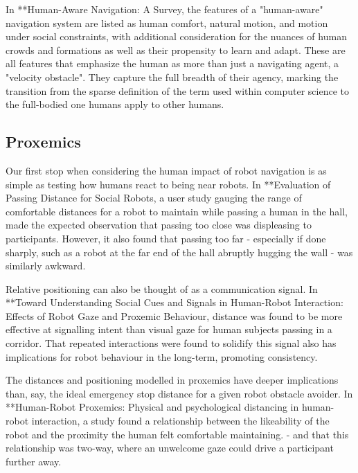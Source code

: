 \documentclass{sfuthesis}
\begin{document}
In **Human-Aware Navigation: A Survey, the features of a "human-aware" navigation system are listed as human comfort, natural motion, and motion under social constraints, with additional consideration for the nuances of human crowds and formations as well as their propensity to learn and adapt. These are all features that emphasize the human as more than just a navigating agent, a "velocity obstacle". They capture the full breadth of their agency, marking the transition from the sparse definition of the term used within computer science to the full-bodied one humans apply to other humans.





\subsection{Proxemics}

Our first stop when considering the human impact of robot navigation is as simple as testing how humans react to being near robots. In **Evaluation of Passing Distance for Social Robots, a user study gauging the range of comfortable distances for a robot to maintain while passing a human in the hall, made the expected observation that passing too close was displeasing to participants. However, it also found that passing too far - especially if done sharply, such as a robot at the far end of the hall abruptly hugging the wall - was similarly awkward. 

Relative positioning can also be thought of as a communication signal. In **Toward Understanding Social Cues and Signals in Human-Robot Interaction: Effects of Robot Gaze and Proxemic Behaviour, distance was found to be more effective at signalling intent than visual gaze for human subjects passing in a corridor. That repeated interactions were found to solidify this signal also has implications for robot behaviour in the long-term, promoting consistency.

The distances and positioning modelled in proxemics have deeper implications than, say, the ideal emergency stop distance for a given robot obstacle avoider. In **Human-Robot Proxemics: Physical and psychological distancing in human-robot interaction, a study found a relationship between the likeability of the robot and the proximity the human felt comfortable maintaining. - and that this relationship was two-way, where an unwelcome gaze could drive a participant further away.
\end{document}
